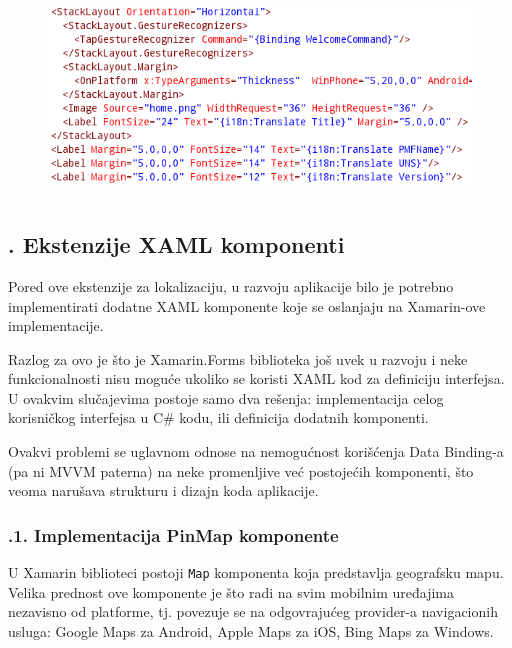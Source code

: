 \documentclass[a4paper]{article}
\begin{document}
\begin{figure}
\centering
\includegraphics[width=127.48mm,height=52.95mm]{msc-img56.png}
\end{figure}
\subsection[7.8. Ekstenzije XAML komponenti]{. Ekstenzije
XAML komponenti}
\hypertarget{RefHeadingToc860882405265}{}Pored ove ekstenzije za
lokalizaciju, u razvoju aplikacije bilo je potrebno implementirati
dodatne XAML komponente koje se oslanjaju na Xamarin-ove
implementacije.

Razlog za ovo je što je Xamarin.Forms biblioteka još uvek u razvoju i
neke funkcionalnosti nisu moguće ukoliko se koristi XAML kod za
definiciju interfejsa. U ovakvim slučajevima postoje samo dva rešenja:
implementacija celog korisničkog interfejsa u C\# kodu, ili definicija
dodatnih komponenti. 

Ovakvi problemi se uglavnom odnose na nemogućnost korišćenja Data
Binding-a (pa ni MVVM paterna) na neke promenljive već postojećih
komponenti, što veoma narušava strukturu i dizajn koda aplikacije.

\subsubsection[]{\rmfamily }
\clearpage\subsubsection[7.8.1. Implementacija PinMap
komponente]{.1. Implementacija PinMap komponente}
\hypertarget{RefHeadingToc862882405265}{}U Xamarin biblioteci postoji
\texttt{\textcolor[rgb]{0.0,0.4,0.8}{Map}} komponenta koja predstavlja
geografsku mapu. Velika prednost ove komponente je što radi na svim
mobilnim uređajima nezavisno od platforme, tj. povezuje se na
odgovrajućeg provider-a navigacionih usluga: Google Maps za Android,
Apple Maps za iOS, Bing Maps za Windows.
\end{document}

